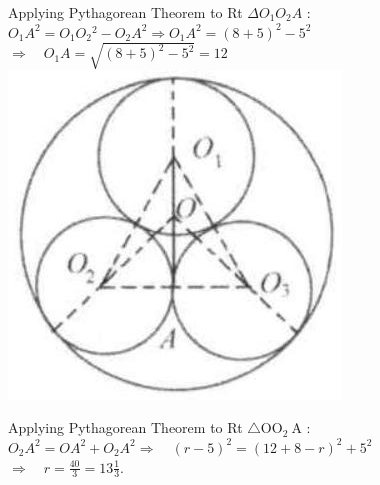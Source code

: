 \documentclass{article}
\begin{document}
Applying Pythagorean Theorem to Rt \(\Delta O_{1} O_{2} A\) :\\
\(O_{1} A^{2}=O_{1} O_{2}{ }^{2}-O_{2} A^{2} \Rightarrow O_{1} A^{2}=(8+5)^{2}-5^{2}\)\\
\(\Rightarrow \quad O_{1} A=\sqrt{(8+5)^{2}-5^{2}}=12\)\\
\centering
\includegraphics[width=\textwidth]{images/reasoning_image_1.jpg}

Applying Pythagorean Theorem to Rt \(\triangle \mathrm{OO}_{2} \mathrm{~A}\) :\\
\(O_{2} A^{2}=O A^{2}+O_{2} A^{2} \Rightarrow \quad(r-5)^{2}=(12+8-r)^{2}+5^{2}\)\\
\(\Rightarrow \quad r=\frac{40}{3}=13 \frac{1}{3}\).\\
\end{document}
